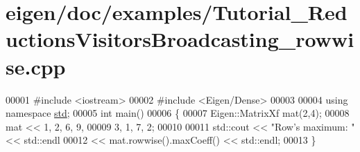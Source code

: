 \hypertarget{eigen_2doc_2examples_2_tutorial___reductions_visitors_broadcasting__rowwise_8cpp_source}{}\section{eigen/doc/examples/\+Tutorial\+\_\+\+Reductions\+Visitors\+Broadcasting\+\_\+rowwise.cpp}
\label{eigen_2doc_2examples_2_tutorial___reductions_visitors_broadcasting__rowwise_8cpp_source}

\begin{DoxyCode}
00001 \textcolor{preprocessor}{#include <iostream>}
00002 \textcolor{preprocessor}{#include <Eigen/Dense>}
00003 
00004 \textcolor{keyword}{using namespace }\hyperlink{namespacestd}{std};
00005 \textcolor{keywordtype}{int} main()
00006 \{
00007   Eigen::MatrixXf mat(2,4);
00008   mat << 1, 2, 6, 9,
00009          3, 1, 7, 2;
00010   
00011   std::cout << \textcolor{stringliteral}{"Row's maximum: "} << std::endl
00012    << mat.rowwise().maxCoeff() << std::endl;
00013 \}
\end{DoxyCode}
